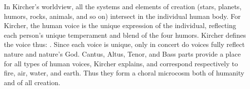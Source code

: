 In Kircher's worldview, all the systems and elements of creation (stars,
planets, humors, rocks, animals, and so on) intersect in the individual human
body.%
    \Autocite[, 402]{Kircher:Musurgia}
For Kircher, the human voice is the unique expression of the individual,
reflecting each person's unique temperament and blend of the four humors.%
    \Autocite[, 23--24]{Kircher:Musurgia}
Kircher defines the voice thus: .%
    \Autocite[, 20]{Kircher:Musurgia}
Since each voice is unique, only in concert do voices fully reflect nature and
nature's God.
Cantus, Altus, Tenor, and Bass parts provide a place for all types of human
voices, Kircher explains, and correspond respectively to fire, air, water, and
earth.
Thus they form a choral microcosm both of humanity and of all creation.%
    \Autocite[, 217--219]{Kircher:Musurgia}


